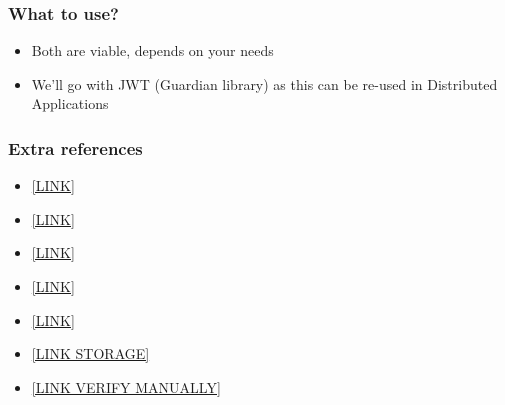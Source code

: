 \begin{frame}
    \frametitle{What to use?}

    \begin{itemize}
        \item Both are viable, depends on your needs
        \item We'll go with JWT (Guardian library) as this can be re-used in Distributed Applications
    \end{itemize}
\end{frame}

\begin{frame}
    \frametitle{Extra references}

    \begin{itemize}
        \item \href{https://medium.com/@sherryhsu/session-vs-token-based-authentication-11a6c5ac45e4}{[LINK]}
        \item \href{https://auth0.com/learn/json-web-tokens/}{[LINK]}
        \item \href{https://medium.com/@theflyingmantis/session-vs-jwt-token-based-authentication-2e85ff6c8f42}{[LINK]}
        \item \href{https://ponyfoo.com/articles/json-web-tokens-vs-session-cookies}{[LINK]}
        \item \href{https://www.pingidentity.com/fr/company/blog/posts/2019/the-hard-parts-of-jwt-security-nobody-talks-about.html}{[LINK]}
        \item \href{https://stormpath.com/blog/where-to-store-your-jwts-cookies-vs-html5-web-storage}{[LINK STORAGE]}
        \item \href{https://www.jsonwebtoken.io/}{[LINK VERIFY MANUALLY]}
    \end{itemize}
\end{frame}
